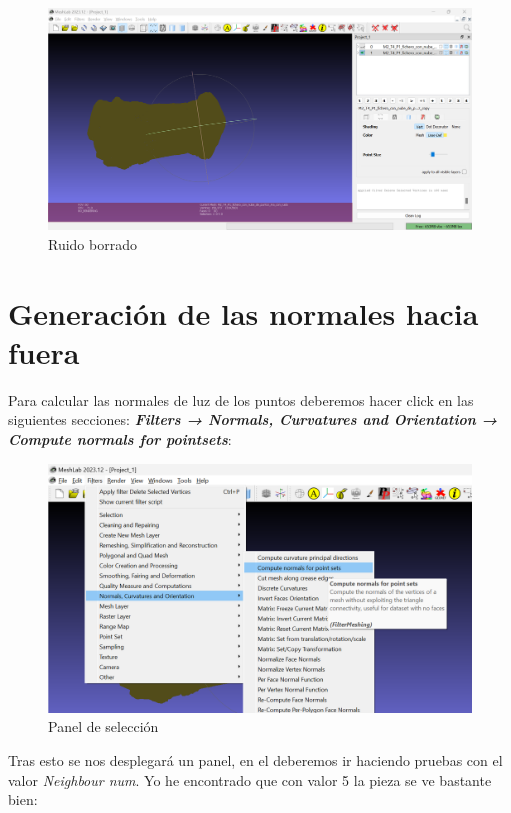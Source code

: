 \documentclass{article}
\begin{document}
\begin{figure}[H]
    \centering
    \includegraphics[scale=0.34]{images/ruido_04.png}
    \caption{Ruido borrado}
\end{figure}

\pagebreak

\section{Generación de las normales hacia fuera}

Para calcular las normales de luz de los puntos deberemos hacer click en las siguientes secciones: \textbf{\textit{Filters → Normals, Curvatures and Orientation → Compute normals for pointsets}}:

\begin{figure}[H]
    \centering
    \includegraphics[scale=0.34]{images/normales_01.png}
    \caption{Panel de selección}
\end{figure}

Tras esto se nos desplegará un panel, en el deberemos ir haciendo pruebas con el valor \textit{Neighbour num}. Yo he encontrado que con valor 5 la pieza se ve bastante bien:
\end{document}
